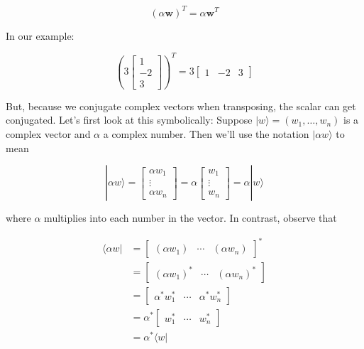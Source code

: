 \documentclass[main.tex]{subfiles}
\begin{document}
    $$
    (\alpha \mathbf{w})^{T}=\alpha \mathbf{w}^{T}
    $$
    
    In our example:
    
    $$
    \left(3\left[\begin{array}{r}
    1 \\
    -2 \\
    3
    \end{array}\right]\right)^{T}=3\left[\begin{array}{lll}
    1 & -2 & 3
    \end{array}\right]
    $$
    
    But, because we conjugate complex vectors when transposing, the scalar can get conjugated. Let's first look at this symbolically: Suppose $|w\rangle=\left(w_{1}, \ldots, w_{n}\right)$ is a complex vector and $\alpha$ a complex number. Then we'll use the notation $|\alpha w\rangle$ to mean
    
    $$
    |\alpha w\rangle=\left[\begin{array}{r}
    \alpha w_{1} \\
    \vdots \\
    \alpha w_{n}
    \end{array}\right]=\alpha\left[\begin{array}{r}
    w_{1} \\
    \vdots \\
    w_{n}
    \end{array}\right]=\alpha|w\rangle
    $$
    
    where $\alpha$ multiplies into each number in the vector. In contrast, observe that
    
    $$
    \begin{aligned}
    \langle\alpha w| &=\left[\begin{array}{lll}
    \left(\alpha w_{1}\right) & \cdots & \left(\alpha w_{n}\right)
    \end{array}\right]^{*} \\
    &=\left[\begin{array}{lll}
    \left(\alpha w_{1}\right)^{*} & \cdots & \left(\alpha w_{n}\right)^{*}
    \end{array}\right] \\
    &=\left[\begin{array}{lll}
    \alpha^{*} w_{1}^{*} & \cdots & \alpha^{*} w_{n}^{*}
    \end{array}\right] \\
    &=\alpha^{*}\left[\begin{array}{lll}
    w_{1}^{*} & \cdots & w_{n}^{*}
    \end{array}\right] \\
    &=\alpha^{*}\langle w|
    \end{aligned}
    $$
    
\end{document}
